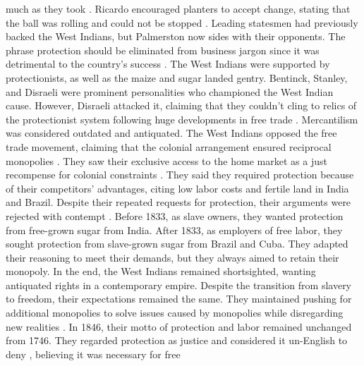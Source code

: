 much as they took . Ricardo encouraged planters to accept change, stating that the ball was rolling and could not be stopped . Leading statesmen had previously backed the West Indians, but Palmerston now sides with their opponents. The phrase protection should be eliminated from business jargon  since it was detrimental to the country's success . The West Indians were supported by protectionists, as well as the maize and sugar landed gentry. Bentinck, Stanley, and Disraeli were prominent personalities who championed the West Indian cause. However, Disraeli attacked it, claiming that they couldn't cling to relics of the protectionist system following huge developments in free trade . Mercantilism was considered outdated and antiquated. The West Indians opposed the free trade movement, claiming that the colonial arrangement ensured reciprocal monopolies . They saw their exclusive access to the home market as a just recompense for colonial constraints . They said they required protection because of their competitors' advantages, citing low labor costs and fertile land in India  and Brazil. Despite their repeated requests for protection, their arguments were rejected with contempt . Before 1833, as slave owners, they wanted protection from free-grown sugar from India. After 1833, as employers of free labor, they sought protection from slave-grown sugar from Brazil and Cuba. They adapted their reasoning to meet their demands, but they always aimed to retain their monopoly. In the end, the West Indians remained shortsighted, wanting antiquated rights in a contemporary empire. Despite the transition from slavery to freedom, their expectations remained the same. They maintained pushing for additional monopolies to solve issues caused by monopolies while disregarding new realities . In 1846, their motto of protection and labor remained unchanged from 1746. They regarded protection as justice  and considered it un-English to deny , believing it was necessary for free 